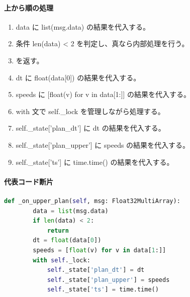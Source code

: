 \documentclass[a4paper,11pt]{article}
\begin{document}
            \paragraph{上から順の処理}
            \begin{enumerate}[leftmargin=1.8em]
            \item data に list(msg.data) の結果を代入する。
\item 条件 len(data) < 2 を判定し、真なら内部処理を行う。
\item    を返す。
\item dt に float(data[0]) の結果を代入する。
\item speeds に [float(v) for v in data[1:]] の結果を代入する。
\item with 文で self.\_lock を管理しながら処理する。
\item   self.\_state['plan\_dt'] に dt の結果を代入する。
\item   self.\_state['plan\_upper'] に speeds の結果を代入する。
\item   self.\_state['ts'] に time.time() の結果を代入する。
            \end{enumerate}
            \paragraph{代表コード断片}
            \begin{lstlisting}[language=Python]
    def _on_upper_plan(self, msg: Float32MultiArray):
        data = list(msg.data)
        if len(data) < 2:
            return
        dt = float(data[0])
        speeds = [float(v) for v in data[1:]]
        with self._lock:
            self._state['plan_dt'] = dt
            self._state['plan_upper'] = speeds
            self._state['ts'] = time.time()
\end{lstlisting}
\end{document}
